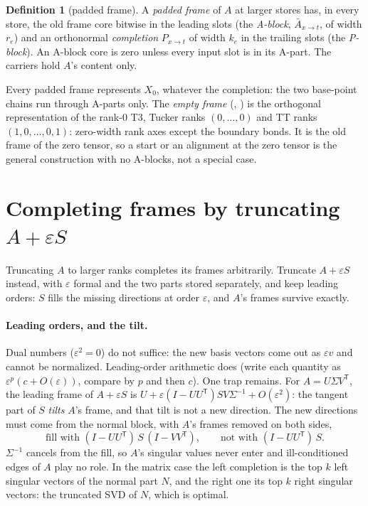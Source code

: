 \documentclass[11pt]{article}
\newcommand{\T}{\mathsf{T}}
\newcommand{\eps}{\varepsilon}
\newcommand{\Abar}{\bar A}
\theoremstyle{definition}
\newtheorem{definition}{Definition}
\theoremstyle{plain}
\begin{document}
\begin{definition}[padded frame]
A \emph{padded frame} of $A$ at larger stores has, in every store, the old frame core bitwise in the leading slots
(the \emph{A-block}, $\Abar_{x\to t}$, of width $r_e$) and an orthonormal \emph{completion} $P_{x\to t}$ of width
$k_e$ in the trailing slots (the \emph{P-block}). An A-block core is zero unless every input slot is in its
A-part. The carriers hold $A$'s content only.
\end{definition}

Every padded frame represents $X_0$, whatever the completion: the two base-point chains run through A-parts only.
The \emph{empty frame} (, ) is the
orthogonal representation of the rank-0 T3, Tucker ranks $(0,\dots,0)$ and TT ranks $(1,0,\dots,0,1)$: zero-width
rank axes except the boundary bonds. It is the old frame of the zero tensor, so a start or an alignment at the zero
tensor is the general construction with no A-blocks, not a special case.

\section{Completing frames by truncating \texorpdfstring{$A+\eps S$}{A + eps S}}\label{sec:truncation}

Truncating $A$ to larger ranks completes its frames arbitrarily. Truncate $A+\eps S$ instead, with $\eps$ formal and
the two parts stored separately, and keep leading orders: $S$ fills the missing directions at order $\eps$, and $A$'s
frames survive exactly.

\paragraph{Leading orders, and the tilt.} Dual numbers ($\eps^2=0$) do not suffice: the new basis vectors come out as
$\eps v$ and cannot be normalized. Leading-order arithmetic does (write each quantity as $\eps^p(c+O(\eps))$, compare by
$p$ and then $c$). One trap remains. For $A=U\Sigma V^\T$, the leading frame of $A+\eps S$ is
$U+\eps(I-UU^\T)SV\Sigma^{-1}+O(\eps^2)$: the tangent part of $S$ \emph{tilts} $A$'s frame, and that tilt is not a
new direction. The new directions must come from the normal block, with $A$'s frames removed on both sides,
\begin{equation}\label{eq:fill}
  \text{fill with } (I-UU^\T)\,S\,(I-VV^\T), \qquad\text{not with } (I-UU^\T)\,S .
\end{equation}
$\Sigma^{-1}$ cancels from the fill, so $A$'s singular values never enter and ill-conditioned edges of $A$ play no
role. In the matrix case the left completion is the top $k$ left singular vectors of the normal part $N$, and the
right one its top $k$ right singular vectors: the truncated SVD of $N$, which is optimal.
\end{document}
